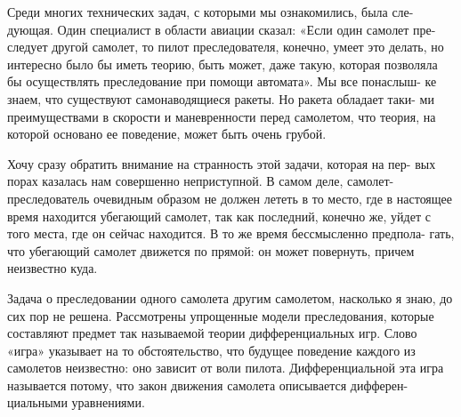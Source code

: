 \documentclass[10pt]{article}
\begin{document}
Среди многих технических задач, с которыми мы ознакомились, была сле- дующая. Один специалист в области авиации сказал: «Если один самолет пре- следует другой самолет, то пилот преследователя, конечно, умеет это делать, но интересно было бы иметь теорию, быть может, даже такую, которая позволяла бы осуществлять преследование при помощи автомата». Мы все понаслыш- ке знаем, что существуют самонаводящиеся ракеты. Но ракета обладает таки- ми преимуществами в скорости и маневренности перед самолетом, что теория, на которой основано ее поведение, может быть очень грубой.

Хочу сразу обратить внимание на странность этой задачи, которая на пер- вых порах казалась нам совершенно неприступной. В самом деле, самолет-преследователь очевидным образом не должен лететь в то место, где в настоящее время находится убегающий самолет, так как последний, конечно же, уйдет с того места, где он сейчас находится. В то же время бессмысленно предпола- гать, что убегающий самолет движется по прямой: он может повернуть, причем неизвестно куда.

Задача о преследовании одного самолета другим самолетом, насколько я знаю, до сих пор не решена. Рассмотрены упрощенные модели преследования, которые составляют предмет так называемой теории дифференциальных игр. Слово «игра» указывает на то обстоятельство, что будущее поведение каждого из самолетов неизвестно: оно зависит от воли пилота. Дифференциальной эта игра называется потому, что закон движения самолета описывается дифферен- циальными уравнениями.
\end{document}
